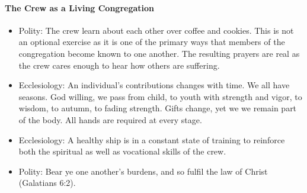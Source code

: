\paragraph{The Crew as a Living Congregation}
\begin{itemize}

\item Polity: The crew learn about each other over coffee and cookies. This is not an optional exercise as it is one of the primary ways that members of the congregation become known to one another. The resulting prayers are real as the crew cares enough to hear how others are suffering.

\item Ecclesiology: An individual’s contributions changes with time. We all have seasons. God willing, we pass from child, to youth with strength and vigor, to wisdom, to autumn, to fading strength. Gifts change, yet we we remain part of the body. All hands are required at every stage.

\item Ecclesiology: A healthy ship is in a constant state of training to reinforce both the spiritual as well as vocational skills of the crew.

\item Polity: Bear ye one another's burdens, and so fulfil the law of Christ (Galatians 6:2).

\end{itemize}



